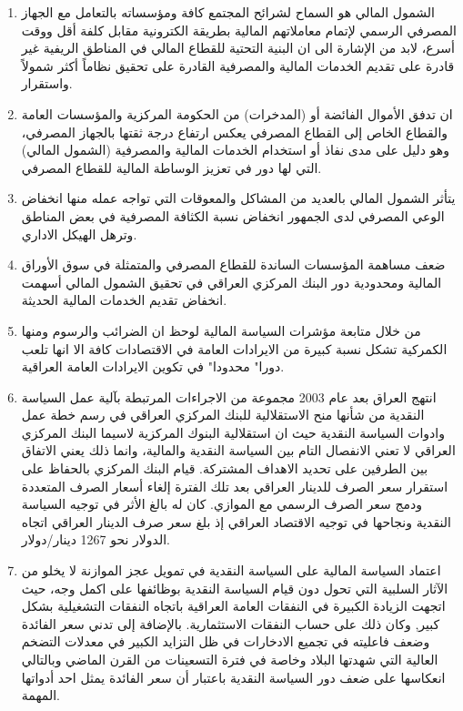 \documentclass[10pt,a4paper]{report}
\begin{document}
\begin{doublespacing}
\begin{enumerate}
	\item الشمول المالي هو السماح لشرائح المجتمع كافة ومؤسساته بالتعامل مع الجهاز المصرفي الرسمي لإتمام معاملاتهم المالية بطريقة الكترونية مقابل كلفة أقل ووقت أسرع، لابد من الإشارة الى ان البنية التحتية للقطاع المالي في المناطق الريفية غير قادرة على تقديم الخدمات المالية والمصرفية القادرة على تحقيق نظاماً أكثر شمولاً واستقرار.
	\item ان تدفق الأموال الفائضة أو (المدخرات) من الحكومة المركزية والمؤسسات العامة والقطاع الخاص إلى القطاع المصرفي يعكس ارتفاع درجة ثقتها بالجهاز المصرفي، وهو دليل على مدى نفاذ أو استخدام الخدمات المالية والمصرفية (الشمول المالي) التي لها دور في تعزيز الوساطة المالية للقطاع المصرفي.
	\item يتأثر الشمول المالي بالعديد من المشاكل والمعوقات التي تواجه عمله منها انخفاض الوعي المصرفي لدى الجمهور انخفاض نسبة الكثافة المصرفية في بعض المناطق وترهل الهيكل الاداري.
	\item ضعف مساهمة المؤسسات الساندة للقطاع المصرفي والمتمثلة في سوق الأوراق المالية ومحدودية دور البنك المركزي العراقي في تحقيق الشمول المالي أسهمت انخفاض تقديم الخدمات المالية الحديثة.
	\item من خلال متابعة مؤشرات السياسة المالية لوحظ ان الضرائب والرسوم ومنها الكمركية تشكل نسبة كبيرة من الايرادات العامة في الاقتصادات كافة الا انها تلعب دورا" محدودا" في تكوين الايرادات العامة العراقية.
	\item انتهج العراق بعد عام 2003 مجموعة من الاجراءات المرتبطة بآلية عمل السياسة النقدية من شأنها منح الاستقلالية للبنك المركزي العراقي في رسم خطة عمل وادوات السياسة النقدية حيث ان استقلالية البنوك المركزية لاسيما البنك المركزي العراقي لا تعني الانفصال التام بين السياسة النقدية والمالية، وانما ذلك يعني الاتفاق بين الطرفين على تحديد الاهداف المشتركة. قيام البنك المركزي بالحفاظ على استقرار سعر الصرف للدينار العراقي بعد تلك الفترة إلغاء أسعار الصرف المتعددة ودمج سعر الصرف الرسمي مع الموازي. كان له بالغ الأثر في توجيه السياسة النقدية ونجاحها في توجيه الاقتصاد العراقي إذ بلغ سعر صرف الدينار العراقي اتجاه الدولار نحو 1267 دينار/دولار.
	\item اعتماد السياسة المالية على السياسة النقدية في تمويل عجز الموازنة لا يخلو من الآثار السلبية التي تحول دون قيام السياسة النقدية بوظائفها على اكمل وجه، حيث اتجهت الزيادة الكبيرة في النفقات العامة العراقية باتجاه النفقات التشغيلية بشكل كبير, وكان ذلك على حساب النفقات الاستثمارية. بالإضافة إلى تدني سعر الفائدة وضعف فاعليته في تجميع الادخارات في ظل التزايد الكبير في معدلات التضخم العالية التي شهدتها البلاد وخاصة في فترة التسعينات من القرن الماضي وبالتالي انعكاسها على ضعف دور السياسة النقدية باعتبار أن سعر الفائدة يمثل احد أدواتها المهمة.

\end{enumerate}
\end{doublespacing}
\end{document}
